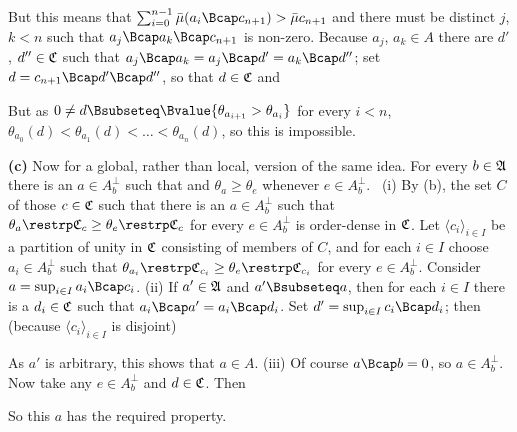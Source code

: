 {

\noindent But this means that
$\sum_{i=0}^{n-1}\bar\mu(a_i\Bcap c_{n+1})>\bar\mu c_{n+1}$ and there
must be distinct $j$, $k<n$ such that $a_j\Bcap a_k\Bcap c_{n+1}$ is non-zero.
Because $a_j$, $a_k\in A$ there are $d'$, $d''\in\frak C$ such that
$a_j\Bcap a_k=a_j\Bcap d'=a_k\Bcap d''$;  set $d=c_{n+1}\Bcap d'\Bcap
d''$, so that $d\in\frak C$ and


\noindent  But as $0\ne d\Bsubseteq\Bvalue{\theta_{a_{i+1}}>\theta_{a_i}}$ for
every $i<n$, $\theta_{a_0}(d)<\theta_{a_1}(d)<\ldots<\theta_{a_n}(d)$, so this is
impossible.   \Bang\Qed

\medskip

{\bf (c)} Now for a global, rather than local, version of the same idea.
For every $b\in\frak A$ there is an $a\in A^{\perp}_b$ such that and
$\theta_a\ge\theta_e$ whenever $e\in A^{\perp}_b$.   \Prf\ (i) By (b), the set $C$
of those $c\in\frak C$ such that there is an $a\in A^{\perp}_b$ such that
$\theta_a\restrp\frak C_c\ge\theta_e\restrp\frak C_c$ for every $e\in A^{\perp}_b$ is
order-dense in $\frak C$.   Let $\langle c_i\rangle_{i\in I}$ be a
partition of unity in $\frak C$ consisting of members of $C$, and for
each $i\in I$ choose $a_i\in A^{\perp}_b$ such that $\theta_{a_i}\restrp\frak
C_{c_i}\ge\theta_e\restrp\frak C_{c_i}$ for every $e\in A^{\perp}_b$.   Consider
$a=\sup_{i\in I}a_i\Bcap c_i$.   (ii) If $a'\in\frak A$ and
$a'\Bsubseteq a$, then for each $i\in I$ there is a $d_i\in\frak C$ such
that $a_i\Bcap a'=a_i\Bcap d_i$.   Set $d'=\sup_{i\in I}c_i\Bcap d_i$;
then (because $\langle c_i\rangle_{i\in I}$ is disjoint)


\noindent As $a'$ is arbitrary, this shows that $a\in A$.   (iii) Of
course $a\Bcap b=0$, so $a\in A^{\perp}_b$.   Now take any $e\in A^{\perp}_b$ and
$d\in\frak C$.   Then


\noindent So this $a$ has the required property.\  \Qed

\medskip

}
